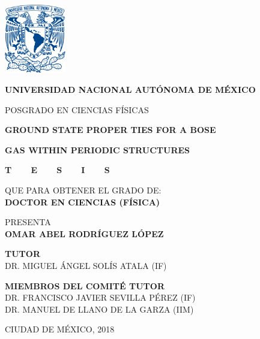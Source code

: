 

\thispagestyle{empty}

\vspace*{-1.5cm}
\begin{center}
  \includegraphics[height=3.0cm]{./figures/logo-unam}
\end{center}

\begin{center}
  {\Large \textbf{UNIVERSIDAD NACIONAL AUTÓNOMA DE MÉXICO}}

  {\Large POSGRADO EN CIENCIAS FÍSICAS}
  \vspace{1.5cm}

  {
    {\LARGE \textbf{GROUND STATE PROPER TIES FOR A BOSE}}

    \vspace*{0.1cm}

    {\LARGE \textbf{GAS WITHIN PERIODIC STRUCTURES}}
  }
  \vspace{1.5cm}

  {\Large
  {\LARGE \textbf{T\ \ \ \ E\ \ \ \ S\ \ \ \ I\ \ \ \ S}}

  QUE PARA OBTENER EL GRADO DE:
  \\[3pt]

  \textbf{DOCTOR EN CIENCIAS (FÍSICA)}

  \vspace{1cm}

  PRESENTA
  \\

  {\LARGE \textbf{OMAR ABEL RODRÍGUEZ LÓPEZ}}

  \vspace{1cm}

  \textbf{TUTOR}
  \\
  {DR. MIGUEL ÁNGEL SOLÍS ATALA (IF)}

  \vspace{1cm}

  \textbf{MIEMBROS DEL COMITÉ TUTOR}
  \\
  {DR. FRANCISCO JAVIER SEVILLA PÉREZ (IF)}
  \\
  {DR. MANUEL DE LLANO DE LA GARZA (IIM)}

  \vspace{1cm}
  {CIUDAD DE MÉXICO, 2018}
  }


\end{center}

\newpage

\thispagestyle{empty}
\begin{vplace}
  \centering
\end{vplace}
